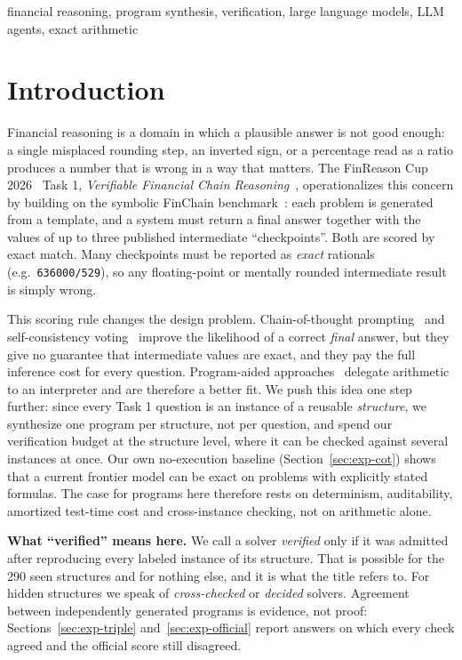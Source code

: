 \documentclass[conference]{IEEEtran}
\begin{document}
\begin{IEEEkeywords}
financial reasoning, program synthesis, verification, large language models, LLM agents, exact arithmetic
\end{IEEEkeywords}

\section{Introduction}
Financial reasoning is a domain in which a plausible answer is not good enough: a single misplaced rounding step, an
inverted sign, or a percentage read as a ratio produces a number that is wrong in a way that matters. The FinReason
Cup 2026~\cite{finreason2026overview} Task 1, \emph{Verifiable Financial Chain Reasoning}~\cite{finreason2026task1overview},
operationalizes this concern by building on the symbolic FinChain benchmark~\cite{xie-etal-2026-finchain}: each problem
is generated from a template, and a system must return a final answer together with the values of up to three
published intermediate ``checkpoints''. Both are scored by exact match. Many checkpoints must be reported as
\emph{exact} rationals (e.g.\ \texttt{636000/529}), so any floating-point or mentally rounded intermediate result is
simply wrong.

This scoring rule changes the design problem. Chain-of-thought prompting~\cite{wei2022cot} and self-consistency
voting~\cite{wang2023selfconsistency} improve the likelihood of a correct \emph{final} answer, but they give no
guarantee that intermediate values are exact, and they pay the full inference cost for every question. Program-aided
approaches~\cite{chen2023pot,gao2023pal} delegate arithmetic to
an interpreter and are therefore a better fit. We push this idea one step further: since every Task 1 question is an
instance of a reusable \emph{structure}, we synthesize one program per structure, not per question, and spend our
verification budget at the structure level, where it can be checked against several instances at once. Our own
no-execution baseline (Section~\ref{sec:exp-cot}) shows that a current frontier model can be exact on problems with
explicitly stated formulas. The case for programs here therefore rests on determinism, auditability, amortized
test-time cost and cross-instance checking, not on arithmetic alone.

\textbf{What ``verified'' means here.} We call a solver \emph{verified} only if it was admitted after reproducing every
labeled instance of its structure. That is possible for the 290 seen structures and for nothing else, and it is what
the title refers to. For hidden structures we speak of \emph{cross-checked} or \emph{decided} solvers. Agreement
between independently generated programs is evidence, not proof: Sections~\ref{sec:exp-triple}
and~\ref{sec:exp-official} report answers on which every check agreed and the official score still disagreed.
\end{document}

